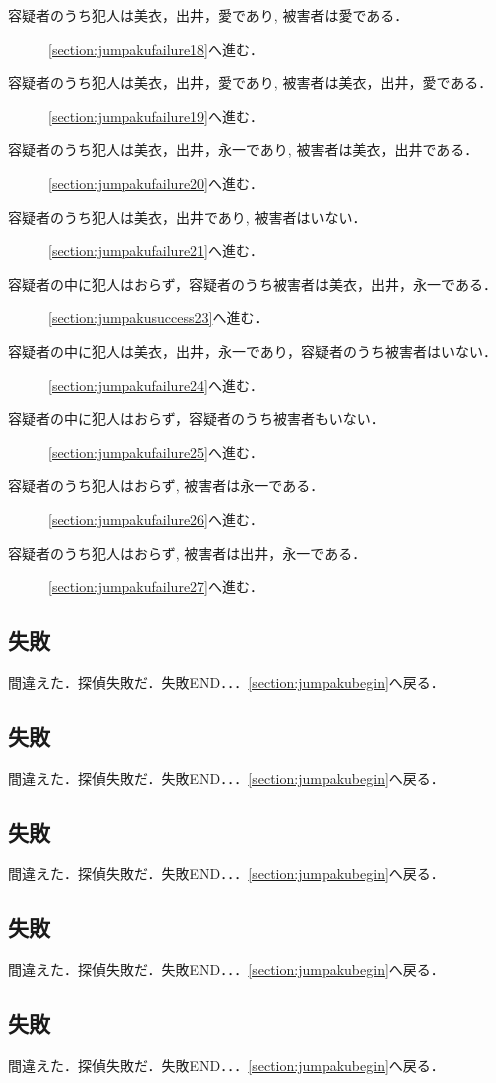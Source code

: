 \begin{description}
\item[容疑者のうち犯人は美衣，出井，愛であり, 被害者は愛である．] \ref{section:jumpakufailure18}へ進む．
\item[容疑者のうち犯人は美衣，出井，愛であり, 被害者は美衣，出井，愛である．] \ref{section:jumpakufailure19}へ進む．
\item[容疑者のうち犯人は美衣，出井，永一であり, 被害者は美衣，出井である．] \ref{section:jumpakufailure20}へ進む．
\item[容疑者のうち犯人は美衣，出井であり, 被害者はいない．] \ref{section:jumpakufailure21}へ進む．
\item[容疑者の中に犯人はおらず，容疑者のうち被害者は美衣，出井，永一である．] \ref{section:jumpakusuccess23}へ進む．
\item[容疑者の中に犯人は美衣，出井，永一であり，容疑者のうち被害者はいない．] \ref{section:jumpakufailure24}へ進む．
\item[容疑者の中に犯人はおらず，容疑者のうち被害者もいない．] \ref{section:jumpakufailure25}へ進む．
\item[容疑者のうち犯人はおらず, 被害者は永一である．] \ref{section:jumpakufailure26}へ進む．
\item[容疑者のうち犯人はおらず, 被害者は出井，永一である．] \ref{section:jumpakufailure27}へ進む．
\end{description}
\newpage

\subsection{失敗}\label{section:jumpakufailure1}間違えた．探偵失敗だ．失敗END．．．\ref{section:jumpakubegin}へ戻る．\newpage
\subsection{失敗}\label{section:jumpakufailure2}間違えた．探偵失敗だ．失敗END．．．\ref{section:jumpakubegin}へ戻る．\newpage
\subsection{失敗}\label{section:jumpakufailure3}間違えた．探偵失敗だ．失敗END．．．\ref{section:jumpakubegin}へ戻る．\newpage
\subsection{失敗}\label{section:jumpakufailure4}間違えた．探偵失敗だ．失敗END．．．\ref{section:jumpakubegin}へ戻る．\newpage
\subsection{失敗}\label{section:jumpakufailure5}間違えた．探偵失敗だ．失敗END．．．\ref{section:jumpakubegin}へ戻る．\newpage
